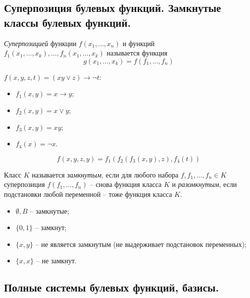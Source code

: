 \subsection{Суперпозиция булевых функций. Замкнутые классы булевых функций.}

\begin{definition}
    \emph{Суперпозицией} функции $f(x_1,\ldots,x_n)$ и функций $f_1(x_1,\ldots,x_k),\ldots,f_n(x_1,\ldots,x_k)$ называется функция
    \[
        g(x_1,\ldots,x_k) = f(f_1,\ldots,f_n)
    \]
\end{definition}

\begin{example}
    $f(x,y,z,t) = (xy \lor z)\rightarrow \lnot t$:
    \begin{itemize}
        \item $f_1(x,y) = x \rightarrow y$;
        \item $f_2(x,y) = x \lor y$;
        \item $f_3(x,y) = xy$;
        \item $f_4(x) = \lnot x$.
    \end{itemize}
    \[
        f(x,y,z,y) = f_1(f_2(f_3(x,y),z),f_4(t))
    \]
\end{example}

\begin{definition}
    Класс $K$ называется \emph{замкнутым}, если для любого набора $f,f_1,\ldots,f_n \in K$ суперпозиция $f(f_1,\ldots,f_n)$ -- снова функция класса $K$ и \emph{разомкнутым}, если подстановки любой переменной -- тоже функция класса $K$.
\end{definition}

\begin{example}\leavevmode
    \begin{itemize}
        \item $\emptyset, B$ -- замкнутые;
        \item $\{0,1\}$ -- замкнут;
        \item $\{x,y\}$ -- не является замкнутым (не выдерживает подстановок переменных);
        \item $\{x,x\}$ -- не замкнут.
    \end{itemize}
\end{example}

\subsection{Полные системы булевых функций, базисы.}


